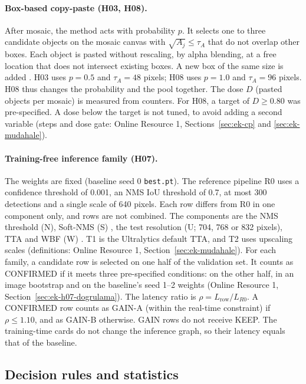 \documentclass[pdflatex,iicol,sn-mathphys-num]{sn-jnl}
\begin{document}
\paragraph{Box-based copy-paste (H03, H08).}
After mosaic, the method acts with probability $p$. It selects one to three candidate objects on the mosaic canvas with $\sqrt{A_j}\le\tau_A$ that do not overlap other boxes. Each object is pasted without rescaling, by alpha blending, at a free location that does not intersect existing boxes. A new box of the same size is added \cite{dwibedi_2017_cutpaste,kisantal_2019_smallaug}. H03 uses $p=0.5$ and $\tau_A=48$ pixels; H08 uses $p=1.0$ and $\tau_A=96$ pixels. H08 thus changes the probability and the pool together. The dose $D$ (pasted objects per mosaic) is measured from counters. For H08, a target of $D\ge0.80$ was pre-specified. A dose below the target is not tuned, to avoid adding a second variable (steps and dose gate: Online Resource 1, Sections~\ref{sec:ek-cp} and \ref{sec:ek-mudahale}).

\paragraph{Training-free inference family (H07).}
The weights are fixed (baseline seed 0 \texttt{best.pt}). The reference pipeline R0 uses a confidence threshold of 0.001, an NMS IoU threshold of 0.7, at most 300 detections and a single scale of 640 pixels. Each row differs from R0 in one component only, and rows are not combined. The components are the NMS threshold (N), Soft-NMS (S) \cite{bodla_2017_softnms}, the test resolution (U; 704, 768 or 832 pixels), TTA \cite{ultralytics_2026_yolov5tta,ultralytics_2026_v84165} and WBF (W) \cite{solovyev_2021_wbf}. T1 is the Ultralytics default TTA, and T2 uses upscaling scales (definitions: Online Resource 1, Section~\ref{sec:ek-mudahale}). For each family, a candidate row is selected on one half of the validation set. It counts as CONFIRMED if it meets three pre-specified conditions: on the other half, in an image bootstrap and on the baseline's seed 1--2 weights (Online Resource 1, Section~\ref{sec:ek-h07-dogrulama}). The latency ratio is $\rho=L_{\text{row}}/L_{R0}$. A CONFIRMED row counts as GAIN-A (within the real-time constraint) if $\rho\le1.10$, and as GAIN-B otherwise. GAIN rows do not receive KEEP. The training-time cards do not change the inference graph, so their latency equals that of the baseline.

\subsection{Decision rules and statistics}\label{sec:karar}
\end{document}

